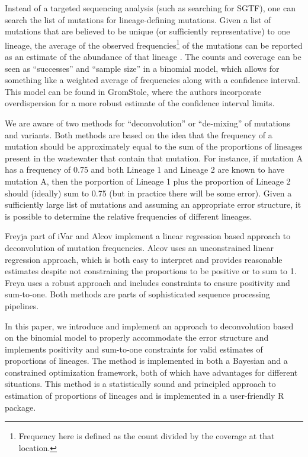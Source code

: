 \documentclass{article}
\begin{document}
Instead of a targeted sequencing analysis (such as searching for SGTF), one can search the list of mutations for lineage-defining mutations.
Given a list of mutations that are believed to be unique (or sufficiently representative) to one lineage, the average of the observed frequencies\footnote{Frequency here is defined as the count divided by the coverage at that location.} of the mutations can be reported as an estimate of the abundance of that lineage \citep{chrystal's preprint}.
The counts and coverage can be seen as ``successes'' and ``sample size'' in a binomial model, which allows for something like a weighted average of frequencies along with a confidence interval.
This model can be found in GromStole, where the authors incorporate overdispersion for a more robust estimate of the confidence interval limits.

We are aware of two methods for ``deconvolution'' or ``de-mixing'' of mutations and variants.
Both methods are based on the idea that the frequency of a mutation should be approximately equal to the sum of the proportions of lineages present in the wastewater that contain that mutation.
For instance, if mutation A has a frequency of 0.75 and both Lineage 1 and Lineage 2 are known to have mutation A, then the porportion of Lineage 1 plus the proportion of Lineage 2 should (ideally) sum to 0.75 (but in practice there will be some error).
Given a sufficiently large list of mutations and assuming an appropriate error structure, it is possible to determine the relative frequencies of different lineages.

Freyja \citep{freyja}{part of iVar} and Alcov implement a linear regression based approach to deconvolution of mutation frequencies.
Alcov uses an unconstrained linear regression approach, which is both easy to interpret and provides reasonable estimates despite not constraining the proportions to be positive or to sum to 1.
Freya uses a robust approach and includes constraints to ensure positivity and sum-to-one.
Both methods are parts of sophisticated sequence processing pipelines.

In this paper, we introduce and implement an approach to deconvolution based on the binomial model to properly accommodate the error structure and implements positivity and sum-to-one constraints for valid estimates of proportions of lineages.
The method is implemented in both a Bayesian and a constrained optimization framework, both of which have advantages for different situations.
This method is a statistically sound and principled approach to estimation of proportions of lineages and is implemented in a user-friendly R package.
\end{document}
